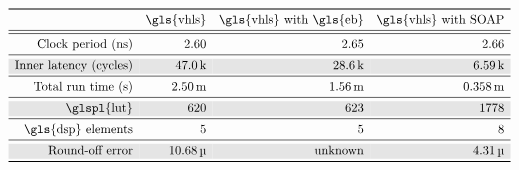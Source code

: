 \begin{table}[ht]
    \centering\singlespacing%
    \renewcommand\arraycolsep{4.0mm}
    \caption{%
        Comparison among the optimized implementations generated by
        \gls{vhls}'s expression balancing and our optimizer.  The row ``Total
        run time (s)'' indicates the wall-clock time in seconds of running the
        synthesized circuits.
    }\label{lo:tab:seidel_results}
    $\begin{array}{rrrr}
        \toprule
        \multicolumn{1}{c}{} &
        \multicolumn{1}{c}{\text{\gls{vhls}}} &
        \multicolumn{1}{c}{\text{\gls{vhls} with \gls{eb}}} &
        \multicolumn{1}{c}{\text{\gls{vhls} with \soap}}
        \\ \midrule\midrule

        \text{Clock period (ns)} &
        2.60 & 2.65 & 2.66 \\ \midrule

        \Shade \text{Inner latency (cycles)} &
        \Shade 47.0\unitk & \Shade 28.6\unitk & \Shade 6.59\unitk \\ \midrule

        \text{Total run time (s)} &
        2.50\unitm & 1.56\unitm & 0.358\unitm \\ \midrule

        \Shade \text{\glspl{lut}} &
        \Shade 620 & \Shade 623 & \Shade 1778 \\ \midrule

        \text{\gls{dsp} elements} &
        5 & 5 & 8 \\ \midrule

        \Shade \text{Round-off error} &
        \Shade 10.68\unitmu &
        \Shade \text{unknown} &
        \Shade 4.31\unitmu \\ \bottomrule
    \end{array}$
\end{table}
